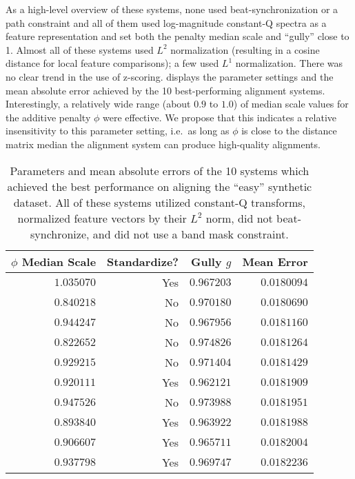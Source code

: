As a high-level overview of these systems, none used beat-synchronization or a path constraint and all of them used log-magnitude constant-Q spectra as a feature representation and set both the penalty median scale and ``gully'' close to 1.
Almost all of these systems used $L^2$ normalization (resulting in a cosine distance for local feature comparisons); a few used $L^1$ normalization.
There was no clear trend in the use of z-scoring.
 displays the parameter settings and the mean absolute error achieved by the 10 best-performing alignment systems.
Interestingly, a relatively wide range (about $0.9$ to $1.0$) of median scale values for the additive penalty $\phi$ were effective.
We propose that this indicates a relative insensitivity to this parameter setting, i.e.\ as long as $\phi$ is close to the distance matrix median the alignment system can produce high-quality alignments.

\begin{table}
\centering
        \begin{tabular}{rrrr}
        \toprule
        $\phi$ Median Scale  & Standardize?   &   Gully $g$ &   Mean Error \\
        \midrule
                  $1.035070$ & Yes            &    $0.967203$ &    $0.0180094$ \\
                  $0.840218$ & No             &    $0.970180$ &    $0.0180690$ \\
                  $0.944247$ & No             &    $0.967956$ &    $0.0181160$ \\
                  $0.822652$ & No             &    $0.974826$ &    $0.0181264$ \\
                  $0.929215$ & No             &    $0.971404$ &    $0.0181429$ \\
                  $0.920111$ & Yes            &    $0.962121$ &    $0.0181909$ \\
                  $0.947526$ & No             &    $0.973988$ &    $0.0181951$ \\
                  $0.893840$ & Yes            &    $0.963922$ &    $0.0181988$ \\
                  $0.906607$ & Yes            &    $0.965711$ &    $0.0182004$ \\
                  $0.937798$ & Yes            &    $0.969747$ &    $0.0182236$ \\
        \bottomrule
        \end{tabular}
  \caption[Parameters and mean absolute errors of the 10 best-performing systems]{Parameters and mean absolute errors of the 10 systems which achieved the best performance on aligning the ``easy'' synthetic dataset.
All of these systems utilized constant-Q transforms, normalized feature vectors by their $L^2$ norm, did not beat-synchronize, and did not use a band mask constraint.}
  \label{tab:best_systems}
\end{table}


